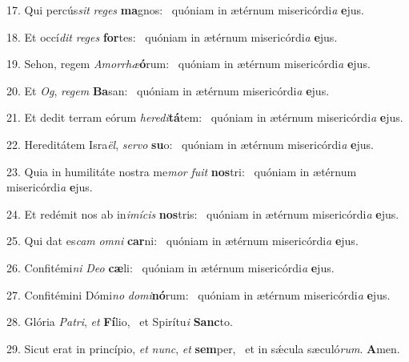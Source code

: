 17. Qui percús\textit{sit} \textit{re}\textit{ges} \textbf{ma}gnos: \ast\  quóniam in ætérnum misericórdi\textit{a} \textbf{e}jus.\

18. Et occí\textit{dit} \textit{re}\textit{ges} \textbf{for}tes: \ast\  quóniam in ætérnum misericórdi\textit{a} \textbf{e}jus.\

19. Sehon, regem \textit{A}\textit{mor}\textit{rhæ}\textbf{ó}rum: \ast\  quóniam in ætérnum misericórdi\textit{a} \textbf{e}jus.\

20. Et \textit{Og}, \textit{re}\textit{gem} \textbf{Ba}san: \ast\  quóniam in ætérnum misericórdi\textit{a} \textbf{e}jus.\

21. Et dedit terram eórum \textit{he}\textit{re}\textit{di}\textbf{tá}tem: \ast\  quóniam in ætérnum misericórdi\textit{a} \textbf{e}jus.\

22. Hereditátem Isra\textit{ël}, \textit{ser}\textit{vo} \textbf{su}o: \ast\  quóniam in ætérnum misericórdi\textit{a} \textbf{e}jus.\

23. Quia in humilitáte nostra me\textit{mor} \textit{fu}\textit{it} \textbf{nos}tri: \ast\  quóniam in ætérnum misericórdi\textit{a} \textbf{e}jus.\

24. Et redémit nos ab in\textit{i}\textit{mí}\textit{cis} \textbf{nos}tris: \ast\  quóniam in ætérnum misericórdi\textit{a} \textbf{e}jus.\

25. Qui dat es\textit{cam} \textit{om}\textit{ni} \textbf{car}ni: \ast\  quóniam in ætérnum misericórdi\textit{a} \textbf{e}jus.\

26. Confitémi\textit{ni} \textit{De}\textit{o} \textbf{cæ}li: \ast\  quóniam in ætérnum misericórdi\textit{a} \textbf{e}jus.\

27. Confitémini Dómi\textit{no} \textit{do}\textit{mi}\textbf{nó}rum: \ast\  quóniam in ætérnum misericórdi\textit{a} \textbf{e}jus.\

28. Glória \textit{Pa}\textit{tri}, \textit{et} \textbf{Fí}lio, \ast\  et Spirítu\textit{i} \textbf{Sanc}to.\

29. Sicut erat in princípio, \textit{et} \textit{nunc}, \textit{et} \textbf{sem}per, \ast\  et in sǽcula sæculó\textit{rum}. \textbf{A}men.\

